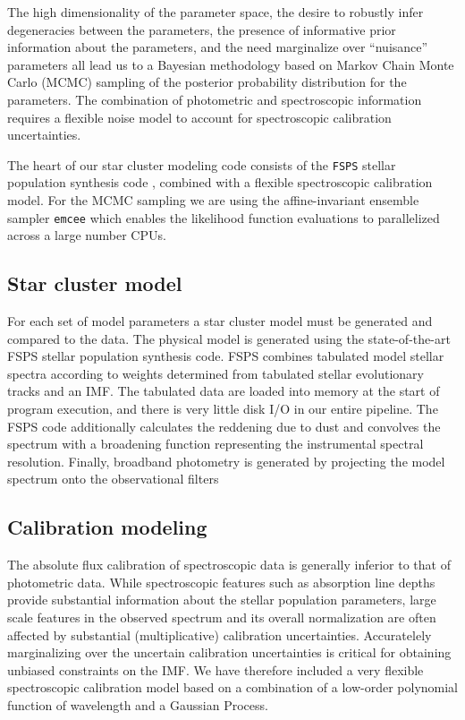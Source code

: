\documentclass[11pt,preprint]{aastex}
\begin{document}
The high dimensionality of the parameter space, the desire to robustly infer degeneracies between the parameters, the presence of informative prior information about the parameters, and the need marginalize over ``nuisance'' parameters all lead us to a Bayesian methodology based on Markov Chain Monte Carlo (MCMC) sampling of the posterior probability distribution for the parameters. 
The combination of photometric and spectroscopic information requires a flexible noise model to account for spectroscopic calibration uncertainties.

The heart of our star cluster modeling code consists of the \texttt{FSPS} stellar population synthesis code \citep{fsps}, combined with a flexible spectroscopic calibration model.  
For the MCMC sampling we are using the affine-invariant ensemble sampler \texttt{emcee} \citep{emcee} which enables the likelihood function evaluations to parallelized across a large number CPUs. 

\subsection{Star cluster model}
For each set of model parameters a star cluster model must be generated and compared to the data. 
The physical model is generated using the state-of-the-art FSPS stellar population synthesis code.
FSPS combines tabulated model stellar spectra according to weights determined from tabulated stellar evolutionary tracks and an IMF.
The tabulated data are loaded into memory at the start of program execution, and there is very little disk I/O in our entire pipeline.
The FSPS code additionally calculates the reddening due to dust and convolves the spectrum with a broadening function representing the instrumental spectral resolution.  
Finally, broadband photometry is generated by projecting the model spectrum onto the observational filters



\subsection{Calibration modeling}
\label{sec:calibration}
The absolute flux calibration of spectroscopic data is generally inferior to that of photometric data.  
While spectroscopic features such as absorption line depths provide substantial information about the stellar population parameters, large scale features in the observed spectrum and its overall normalization are often affected by substantial (multiplicative) calibration uncertainties. 
Accuratelely marginalizing over the uncertain calibration uncertainties is critical for obtaining unbiased constraints on the IMF. We have therefore included a very flexible spectroscopic calibration model based on a combination of a low-order polynomial function of wavelength and a Gaussian Process.
\end{document}

